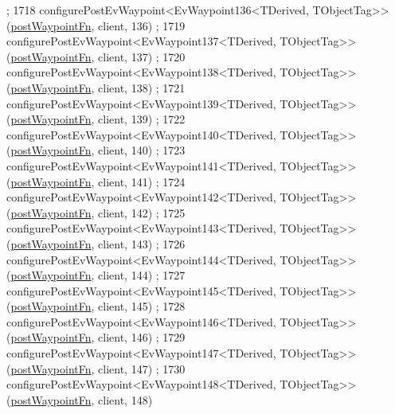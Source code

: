 \begin{DoxyCode}
      ;
1718     configurePostEvWaypoint<EvWaypoint136<TDerived, TObjectTag>>(\hyperlink{classcl__move__base__z_1_1WaypointEventDispatcher_a964a57fcce5d48ec60243230722d8dd7}{postWaypointFn}, client, 136)
      ;
1719     configurePostEvWaypoint<EvWaypoint137<TDerived, TObjectTag>>(\hyperlink{classcl__move__base__z_1_1WaypointEventDispatcher_a964a57fcce5d48ec60243230722d8dd7}{postWaypointFn}, client, 137)
      ;
1720     configurePostEvWaypoint<EvWaypoint138<TDerived, TObjectTag>>(\hyperlink{classcl__move__base__z_1_1WaypointEventDispatcher_a964a57fcce5d48ec60243230722d8dd7}{postWaypointFn}, client, 138)
      ;
1721     configurePostEvWaypoint<EvWaypoint139<TDerived, TObjectTag>>(\hyperlink{classcl__move__base__z_1_1WaypointEventDispatcher_a964a57fcce5d48ec60243230722d8dd7}{postWaypointFn}, client, 139)
      ;
1722     configurePostEvWaypoint<EvWaypoint140<TDerived, TObjectTag>>(\hyperlink{classcl__move__base__z_1_1WaypointEventDispatcher_a964a57fcce5d48ec60243230722d8dd7}{postWaypointFn}, client, 140)
      ;
1723     configurePostEvWaypoint<EvWaypoint141<TDerived, TObjectTag>>(\hyperlink{classcl__move__base__z_1_1WaypointEventDispatcher_a964a57fcce5d48ec60243230722d8dd7}{postWaypointFn}, client, 141)
      ;
1724     configurePostEvWaypoint<EvWaypoint142<TDerived, TObjectTag>>(\hyperlink{classcl__move__base__z_1_1WaypointEventDispatcher_a964a57fcce5d48ec60243230722d8dd7}{postWaypointFn}, client, 142)
      ;
1725     configurePostEvWaypoint<EvWaypoint143<TDerived, TObjectTag>>(\hyperlink{classcl__move__base__z_1_1WaypointEventDispatcher_a964a57fcce5d48ec60243230722d8dd7}{postWaypointFn}, client, 143)
      ;
1726     configurePostEvWaypoint<EvWaypoint144<TDerived, TObjectTag>>(\hyperlink{classcl__move__base__z_1_1WaypointEventDispatcher_a964a57fcce5d48ec60243230722d8dd7}{postWaypointFn}, client, 144)
      ;
1727     configurePostEvWaypoint<EvWaypoint145<TDerived, TObjectTag>>(\hyperlink{classcl__move__base__z_1_1WaypointEventDispatcher_a964a57fcce5d48ec60243230722d8dd7}{postWaypointFn}, client, 145)
      ;
1728     configurePostEvWaypoint<EvWaypoint146<TDerived, TObjectTag>>(\hyperlink{classcl__move__base__z_1_1WaypointEventDispatcher_a964a57fcce5d48ec60243230722d8dd7}{postWaypointFn}, client, 146)
      ;
1729     configurePostEvWaypoint<EvWaypoint147<TDerived, TObjectTag>>(\hyperlink{classcl__move__base__z_1_1WaypointEventDispatcher_a964a57fcce5d48ec60243230722d8dd7}{postWaypointFn}, client, 147)
      ;
1730     configurePostEvWaypoint<EvWaypoint148<TDerived, TObjectTag>>(\hyperlink{classcl__move__base__z_1_1WaypointEventDispatcher_a964a57fcce5d48ec60243230722d8dd7}{postWaypointFn}, client, 148)

\end{DoxyCode}
